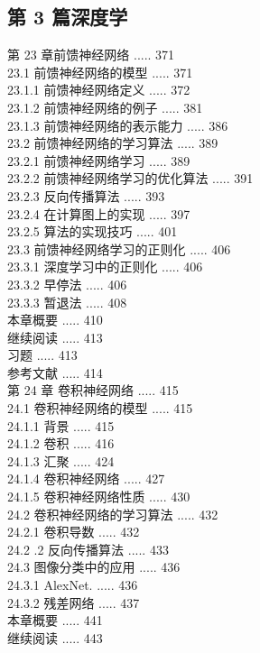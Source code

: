 \documentclass[10pt]{article}
\begin{document}
\begin{CJK*}{UTF8}{bsmi}
\section*{第 3 篇深度学}
第 23 章前馈神经网络 ..... 371\\
23.1 前馈神经网络的模型 ..... 371\\
23.1.1 前馈神经网络定义 ..... 372\\
23.1.2 前馈神经网络的例子 ..... 381\\
23.1.3 前馈神经网络的表示能力 ..... 386\\
23.2 前馈神经网络的学习算法 ..... 389\\
23.2.1 前馈神经网络学习 ..... 389\\
23.2.2 前馈神经网络学习的优化算法 ..... 391\\
23.2.3 反向传播算法 ..... 393\\
23.2.4 在计算图上的实现 ..... 397\\
23.2.5 算法的实现技巧 ..... 401\\
23.3 前馈神经网络学习的正则化 ..... 406\\
23.3.1 深度学习中的正则化 ..... 406\\
23.3.2 早停法 ..... 406\\
23.3.3 暂退法 ..... 408\\
本章概要 ..... 410\\
继续阅读 ..... 413\\
习题 ..... 413\\
参考文献 ..... 414\\
第 24 章 卷积神经网络 ..... 415\\
24.1 卷积神经网络的模型 ..... 415\\
24.1.1 背景 ..... 415\\
24.1.2 卷积 ..... 416\\
24.1.3 汇聚 ..... 424\\
24.1.4 卷积神经网络 ..... 427\\
24.1.5 卷积神经网络性质 ..... 430\\
24.2 卷积神经网络的学习算法 ..... 432\\
24.2.1 卷积导数 ..... 432\\
24.2 .2 反向传播算法 ..... 433\\
24.3 图像分类中的应用 ..... 436\\
24.3.1 AlexNet. ..... 436\\
24.3.2 残差网络 ..... 437\\
本章概要 ..... 441\\
继续阅读 ..... 443\\

\end{CJK*}
\end{document}
